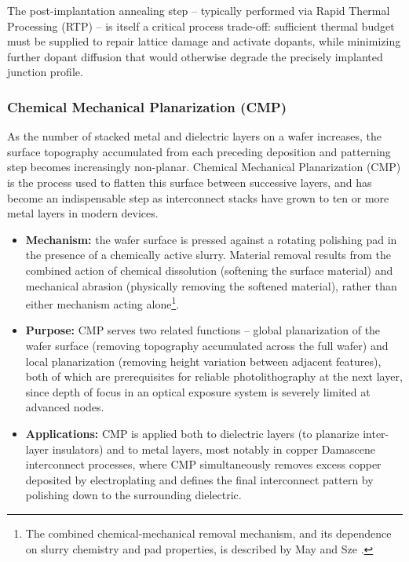 \documentclass[10pt,a4paper]{article}
\begin{document}
The post-implantation annealing step -- typically performed via Rapid Thermal 
Processing (RTP) -- is itself a critical process trade-off: sufficient thermal 
budget must be supplied to repair lattice damage and activate dopants, while 
minimizing further dopant diffusion that would otherwise degrade the precisely 
implanted junction profile.

\subsubsection{Chemical Mechanical Planarization (CMP)}

As the number of stacked metal and dielectric layers on a wafer increases, the 
surface topography accumulated from each preceding deposition and patterning 
step becomes increasingly non-planar. Chemical Mechanical Planarization (CMP) 
is the process used to flatten this surface between successive layers, and has 
become an indispensable step as interconnect stacks have grown to ten or more 
metal layers in modern devices.

\begin{itemize}
    \item \textbf{Mechanism:} the wafer surface is pressed against a rotating 
    polishing pad in the presence of a chemically active slurry. Material 
    removal results from the combined action of chemical dissolution (softening 
    the surface material) and mechanical abrasion (physically removing the 
    softened material), rather than either mechanism acting 
    alone\footnote{The combined chemical-mechanical removal mechanism, and its 
    dependence on slurry chemistry and pad properties, is described by May and 
    Sze \cite{maysze2004}.}.
    \item \textbf{Purpose:} CMP serves two related functions -- global 
    planarization of the wafer surface (removing topography accumulated across 
    the full wafer) and local planarization (removing height variation between 
    adjacent features), both of which are prerequisites for reliable 
    photolithography at the next layer, since depth of focus in an optical 
    exposure system is severely limited at advanced nodes.
    \item \textbf{Applications:} CMP is applied both to dielectric layers (to 
    planarize inter-layer insulators) and to metal layers, most notably in 
    copper Damascene interconnect processes, where CMP simultaneously removes 
    excess copper deposited by electroplating and defines the final 
    interconnect pattern by polishing down to the surrounding dielectric.
\end{itemize}
\end{document}
